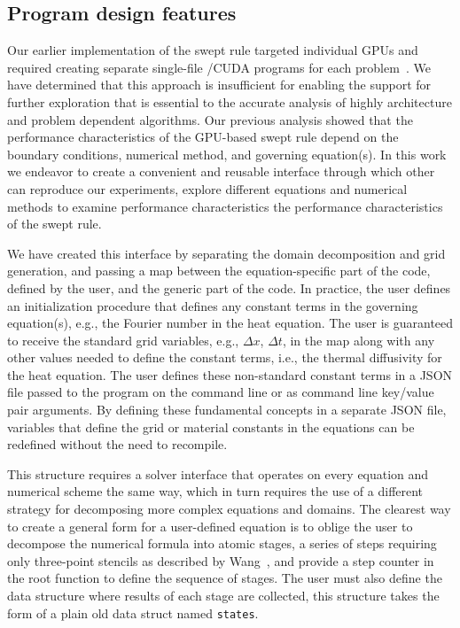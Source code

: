 \subsection{Program design features} \label{sec:ProgDesign}

Our earlier implementation of the swept rule targeted individual GPUs and required creating separate single-file
\CC{}\slash CUDA programs for each problem~\cite{OurJCP}.
We have determined that this approach is insufficient for enabling the support for further exploration that is essential to the accurate analysis of highly architecture
and problem dependent algorithms.
Our previous analysis showed that the performance characteristics of the GPU-based swept rule depend
on the boundary conditions, numerical method, and governing equation(s).
In this work we endeavor to create a convenient and reusable interface through which other can reproduce our experiments, explore different equations and numerical methods to examine performance characteristics the performance characteristics of the swept rule.

We have created this interface by separating the domain decomposition and grid generation, and passing
a map between the equation-specific part of the code, defined by the user, and the generic part of the code.
In practice, the user defines an initialization procedure that defines any constant terms in the
governing equation(s), e.g., the Fourier number in the heat equation.
The user is guaranteed to receive the standard grid variables, e.g., $\Delta x$, $\Delta t$, in the map
along with any other values needed to define the constant terms, i.e., the thermal diffusivity
for the heat equation.
The user defines these non-standard constant terms in a JSON file passed to the program on the command line
or as command line key/value pair arguments. By defining these fundamental concepts in a separate JSON
file, variables that define the grid or material constants in the equations can be redefined without
the need to recompile.

This structure requires a solver interface that operates on every equation and numerical scheme
the same way, which in turn requires the use of a different strategy for decomposing more complex
equations and domains.
The clearest way to create a general form for a user-defined equation is to oblige the user to decompose
the numerical formula into atomic stages, a series of steps requiring only three-point stencils as described
by Wang~\cite{WangDecomp}, and provide a step counter in the root function to define the sequence of stages.
The user must also define the data structure where results of each stage are collected, this structure takes the form of a plain old data struct named \texttt{states}.

